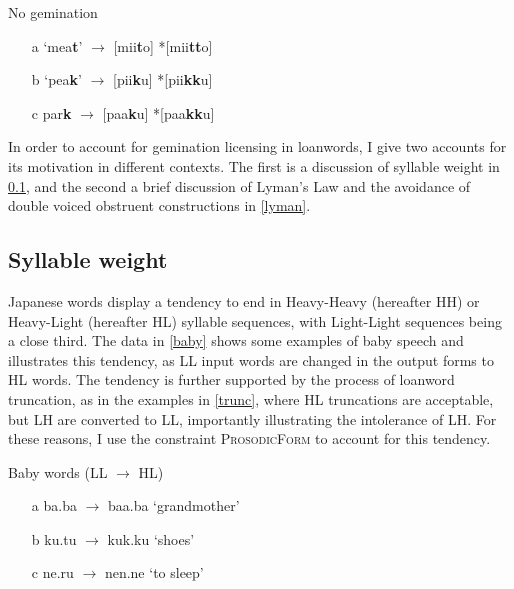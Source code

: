 \documentclass{article}
\begin{document}
\begin{exe}
    \ex
    No gemination
    \begin{itemize}
        \item [a] ‘mea\textbf{t}' $\rightarrow$ [mii\textbf{t}o] \hspace{1cm} *[mii\textbf{tt}o]
        \item [b] ‘pea\textbf{k}' $\rightarrow$ [pii\textbf{k}u] \hspace{1cm} *[pii\textbf{kk}u]
        \item [c] par\textbf{k} $\rightarrow$ [paa\textbf{k}u] \hspace{1cm} *[paa\textbf{kk}u]
    \end{itemize}
    \label{tense}
    
\end{exe}

In order to account for gemination licensing in loanwords, I give two accounts for its motivation in different contexts. The first is a discussion of syllable weight in \ref{syllableweight}, and the second a brief discussion of Lyman's Law and the avoidance of double voiced obstruent constructions in \ref{lyman}.

\subsection{Syllable weight}
\label{syllableweight}


Japanese words display a tendency to end in Heavy-Heavy (hereafter HH) or Heavy-Light (hereafter HL) syllable sequences, with Light-Light sequences being a close third. The data in \ref{baby} shows some examples of baby speech and illustrates this tendency, as LL input words are changed in the output forms to HL words. The tendency is further supported by the process of loanword truncation, as in the examples in \ref{trunc}, where HL truncations are acceptable, but LH are converted to LL, importantly illustrating the intolerance of LH. For these reasons, I use the constraint \textsc{ProsodicForm} to account for this tendency. \citep[p. 5]{Kubozono2009}

\begin{exe}
    \ex
    Baby words (LL $\rightarrow$ HL)
    \label{baby}
    \begin{itemize}
        \item [a] ba.ba $\rightarrow$ baa.ba ‘grandmother'
        \item [b] ku.tu $\rightarrow$ kuk.ku ‘shoes'
        \item [c] ne.ru $\rightarrow$ nen.ne ‘to sleep'
    \end{itemize}
\end{exe}
\end{document}
